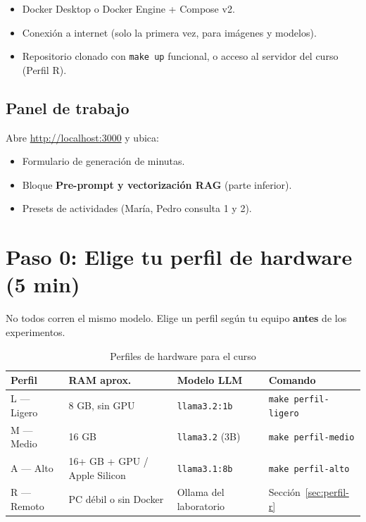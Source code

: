 \documentclass[12pt,a4paper]{article}
\begin{document}
\begin{itemize}[noitemsep]
  \item Docker Desktop o Docker Engine + Compose v2.
  \item Conexión a internet (solo la primera vez, para imágenes y modelos).
  \item Repositorio clonado con \texttt{make up} funcional, o acceso al servidor
        del curso (Perfil R).
\end{itemize}

\subsection{Panel de trabajo}

Abre \url{http://localhost:3000} y ubica:

\begin{itemize}[noitemsep]
  \item Formulario de generación de minutas.
  \item Bloque \textbf{Pre-prompt y vectorización RAG} (parte inferior).
  \item Presets de actividades (María, Pedro consulta 1 y 2).
\end{itemize}

\section{Paso 0: Elige tu perfil de hardware (5 min)}

No todos corren el mismo modelo. Elige un perfil según tu equipo \textbf{antes}
de los experimentos.

\begin{table}[h]
\centering
\caption{Perfiles de hardware para el curso}
\begin{tabular}{@{}llll@{}}
\toprule
\textbf{Perfil} & \textbf{RAM aprox.} & \textbf{Modelo LLM} & \textbf{Comando} \\
\midrule
L --- Ligero & 8 GB, sin GPU & \texttt{llama3.2:1b} & \texttt{make perfil-ligero} \\
M --- Medio  & 16 GB & \texttt{llama3.2} (3B) & \texttt{make perfil-medio} \\
A --- Alto   & 16+ GB + GPU / Apple Silicon & \texttt{llama3.1:8b} & \texttt{make perfil-alto} \\
R --- Remoto & PC débil o sin Docker & Ollama del laboratorio & Sección~\ref{sec:perfil-r} \\
\bottomrule
\end{tabular}
\end{table}
\end{document}
